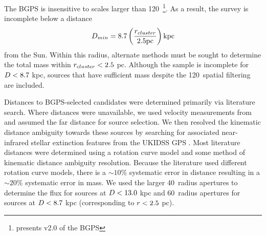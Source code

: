

The BGPS is insensitive to scales larger than 120\arcsec\
\citep[][]{Ginsburg2012}\footnote{\citet{Ginsburg2012} presents v2.0 of the
BGPS}.  As a result, the survey is incomplete below a distance $$D_{min} =
8.7 \left(\frac{r_{cluster}}{2.5 \textrm{pc}}\right) \textrm{kpc} $$ from
the Sun.  Within this radius, alternate methods must be sought to determine the
total mass within $r_{cluster} < 2.5$ pc.  Although the sample is
incomplete for $D < 8.7$ kpc, sources that have sufficient mass despite
the 120\arcsec\ spatial filtering are included.


Distances to BGPS-selected candidates were determined primarily via literature
search.  Where distances were unavailable, we used velocity measurements from
\citet{Schlingman2011} and assumed the far distance for source selection.  We
then resolved the kinematic distance ambiguity towards these sources by
searching for associated near-infrared stellar extinction features from the
UKIDSS GPS \citep{Lucas2008}.
Most literature distances were determined using a
rotation curve model and some method of kinematic distance ambiguity
resolution. Because the literature used different rotation curve models, there
is a $\sim10\%$ systematic error in distance resulting in a $\sim20\%$
systematic error in mass. We used the larger
40\arcsec\ radius apertures to determine the flux for sources at
$D<13.0$ kpc and 60\arcsec\ radius apertures for sources at $D<8.7$
kpc (corresponding to $r<2.5$ pc).

